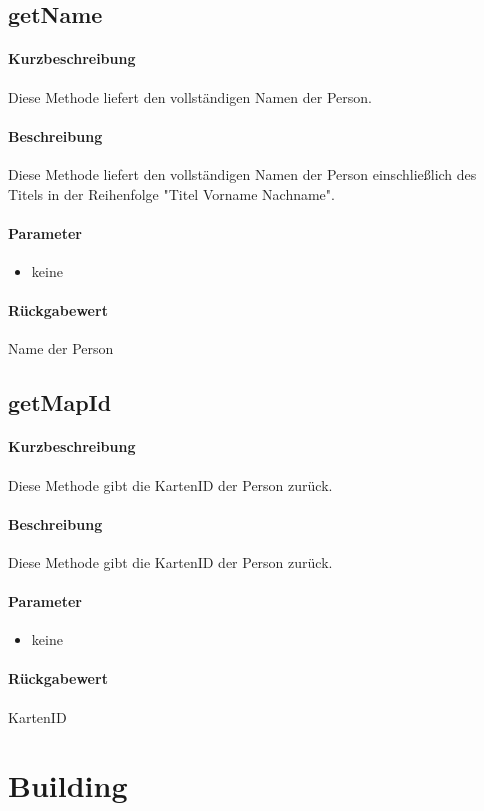 \subsection{getName}%
\paragraph*{Kurzbeschreibung}
Diese Methode liefert den vollständigen Namen der Person.
\paragraph*{Beschreibung}
Diese Methode liefert den vollständigen Namen der Person einschließlich des Titels in der Reihenfolge "Titel Vorname Nachname".
\paragraph*{Parameter}
\begin{itemize}
    \item keine
\end{itemize}
\paragraph*{Rückgabewert}
Name der Person

\subsection{getMapId}
\paragraph*{Kurzbeschreibung}
Diese Methode gibt die KartenID der Person zurück.
\paragraph*{Beschreibung}
Diese Methode gibt die KartenID der Person zurück.
\paragraph*{Parameter}
\begin{itemize}
    \item keine
\end{itemize}
\paragraph*{Rückgabewert}
KartenID


\section{Building}
